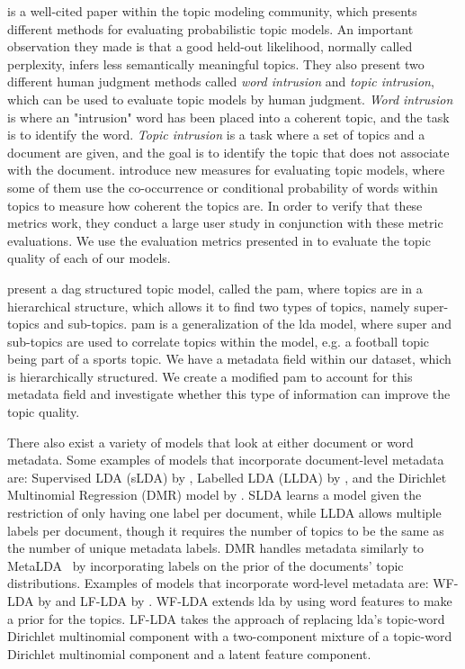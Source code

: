 \citet{tea_leaves} is a well-cited paper within the topic modeling community, which presents different methods for evaluating probabilistic topic models. 
An important observation they made is that a good held-out likelihood, normally called perplexity, infers less semantically meaningful topics.
They also present two different human judgment methods called \emph{word intrusion} and \emph{topic intrusion}, which can be used to evaluate topic models by human judgment. 
\emph{Word intrusion} is where an "intrusion" word has been placed into a coherent topic, and the task is to identify the word.
\emph{Topic intrusion} is a task where a set of topics and a document are given, and the goal is to identify the topic that does not associate with the document. 
\citet{topic_coherence_2015} introduce new measures for evaluating topic models, where some of them use the co-occurrence or conditional probability of words within topics to measure how coherent the topics are. 
In order to verify that these metrics work, they conduct a large user study in conjunction with these metric evaluations.
We use the evaluation metrics presented in \citet{topic_coherence_2015} to evaluate the topic quality of each of our models.

\citet{li2006pachinko} present a \gls{dag} structured topic model, called the \acrfull{pam}, where topics are in a hierarchical structure, which allows it to find two types of topics, namely super-topics and sub-topics. 
\Gls{pam} is a generalization of the \gls{lda} model, where super and sub-topics are used to correlate topics within the model, e.g. a football topic being part of a sports topic.
We have a metadata field within our dataset, which is hierarchically structured.
We create a modified \gls{pam} to account for this metadata field and investigate whether this type of information can improve the topic quality.

There also exist a variety of models that look at either document or word metadata.
Some examples of models that incorporate document-level metadata are: Supervised LDA (sLDA) by \citet{blei2010supervised}, Labelled LDA (LLDA) by \citet{llda2009}, and the Dirichlet Multinomial Regression (DMR) model by \citet{mimno2008topic}.
SLDA learns a model given the restriction of only having one label per document, while LLDA allows multiple labels per document, though it requires the number of topics to be the same as the number of unique metadata labels.
DMR handles metadata similarly to MetaLDA~\cite{MetaLDA2017} by incorporating labels on the prior of the documents' topic distributions.
Examples of models that incorporate word-level metadata are: WF-LDA by \citet{wf-lda2010} and LF-LDA by \citet{lf-lda2015}.
WF-LDA extends \gls{lda} by using word features to make a prior for the topics.
LF-LDA takes the approach of replacing \gls{lda}'s topic-word Dirichlet multinomial component with a two-component mixture of a topic-word Dirichlet multinomial component and a latent feature component.

